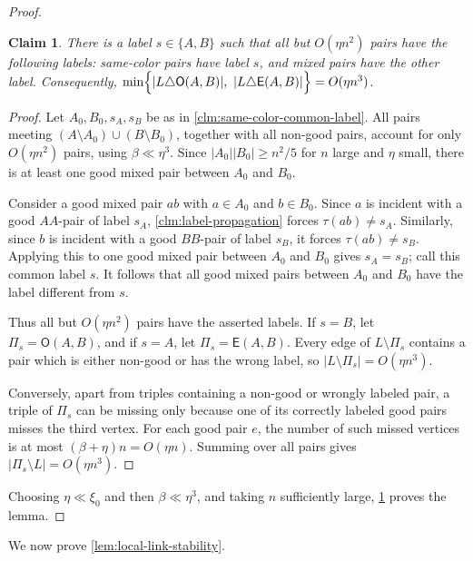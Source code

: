 \documentclass[10pt,a4paper]{article}
\theoremstyle{plain}
\newtheorem{claim}[claim]{Claim}
\theoremstyle{definition}
\begin{document}
\begin{proof}
\begin{claim}\label{clm:mixed-labels-and-template}
There is a label $s\in\{A,B\}$ such that all but $O(\eta n^2)$ pairs have the following labels: same-color pairs have label $s$, and mixed pairs have the other label.  Consequently, $\min\Bigl\{|L\triangle \mathsf O(A,B)|,\ |L\triangle \mathsf E(A,B)|\Bigr\}=O(\eta n^3)$. 
\end{claim}

\begin{proof}
Let $A_0,B_0,s_A,s_B$ be as in \cref{clm:same-color-common-label}.  All pairs meeting $(A\setminus A_0)\cup(B\setminus B_0)$, together with all non-good pairs, account for only $O(\eta n^2)$ pairs, using $\beta\ll\eta^3$.  Since $|A_0||B_0|\ge n^2/5$ for $n$ large and $\eta$ small, there is at least one good mixed pair between $A_0$ and $B_0$.

Consider a good mixed pair $ab$ with $a\in A_0$ and $b\in B_0$.  Since $a$ is incident with a good $AA$-pair of label $s_A$, \cref{clm:label-propagation} forces $\tau(ab)\ne s_A$.  Similarly, since $b$ is incident with a good $BB$-pair of label $s_B$, it forces $\tau(ab)\ne s_B$.  Applying this to one good mixed pair between $A_0$ and $B_0$ gives $s_A=s_B$; call this common label $s$.  It follows that all good mixed pairs between $A_0$ and $B_0$ have the label different from $s$.

Thus all but $O(\eta n^2)$ pairs have the asserted labels.  If $s=B$, let $\Pi_s=\mathsf O(A,B)$, and if $s=A$, let $\Pi_s=\mathsf E(A,B)$.  Every edge of $L\setminus\Pi_s$ contains a pair which is either non-good or has the wrong label, so $|L\setminus\Pi_s|=O(\eta n^3)$.

Conversely, apart from triples containing a non-good or wrongly labeled pair, a triple of $\Pi_s$ can be missing only because one of its correctly labeled good pairs misses the third vertex.  For each good pair $e$, the number of such missed vertices is at most $(\beta+\eta)n=O(\eta n)$.  Summing over all pairs gives $|\Pi_s\setminus L|=O(\eta n^3)$.
\end{proof}

Choosing $\eta\ll\xi_0$ and then $\beta\ll\eta^3$, and taking $n$ sufficiently large, \cref{clm:mixed-labels-and-template} proves the lemma.
\end{proof}


We now prove \cref{lem:local-link-stability}. 
\end{document}
